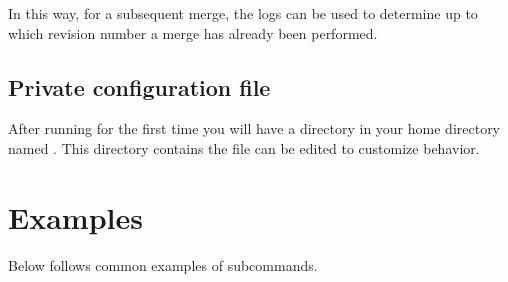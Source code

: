 \documentclass[10pt,a4paper]{simson}
\begin{document}
In this way, for a subsequent merge, the logs can be used to determine
up to which revision number a merge has already been performed.


\section{Private configuration file}
After running  for the first time you will have a
directory in your home directory named . This
directory contains the file  can be edited
to customize  behavior.


\chapter{Examples}
Below follows common examples of  subcommands.
\end{document}

